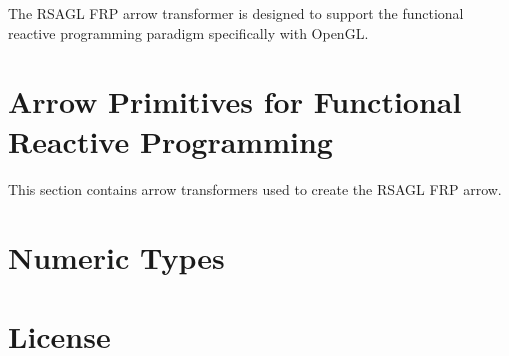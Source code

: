 \documentclass[pdftex]{article}
\begin{document}
The RSAGL FRP arrow transformer is designed to support the functional reactive programming paradigm
specifically with OpenGL.




\part{Arrow Primitives for Functional Reactive Programming}

This section contains arrow transformers used to create the RSAGL FRP arrow.






\part{Numeric Types}




\part{License}


\end{document}
